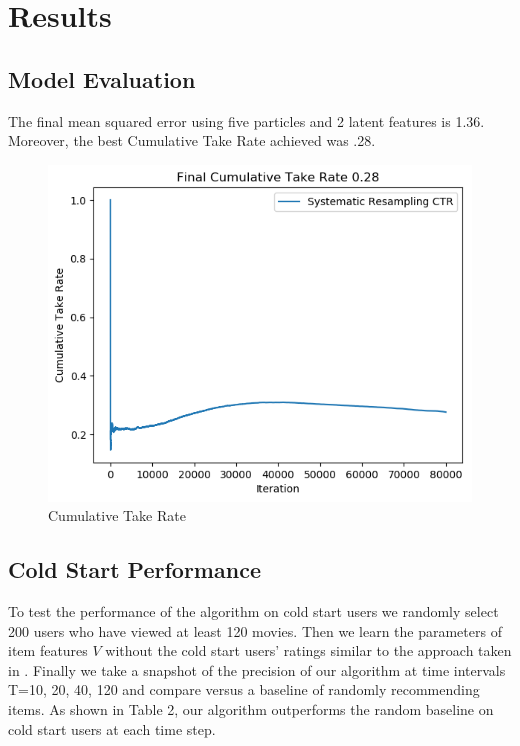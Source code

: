\documentclass{article}
\begin{document}
\section{Results}

\subsection{Model Evaluation}

The final mean squared error using five particles and 2 latent features is 1.36. Moreover, the best Cumulative Take Rate achieved was .28.

\begin{figure}[ht]
\begin{center}
\centerline{\includegraphics[width=\columnwidth]{CTR}}
\caption{Cumulative Take Rate}
\label{MSEResampling}
\end{center}
\vskip -0.4in
\end{figure}


\subsection{Cold Start Performance}
To test the performance of the algorithm on cold start users we randomly select 200 users who have viewed at least 120 movies. Then we learn the parameters of item features $V$ without the cold start users’ ratings similar to the approach taken in \cite{zhao2013interactive}. Finally we take a snapshot of the precision of our algorithm at time intervals T=10, 20, 40, 120 and compare versus a baseline of randomly recommending items. As shown in Table 2, our algorithm outperforms the random baseline on cold start users at each time step.
\end{document}

